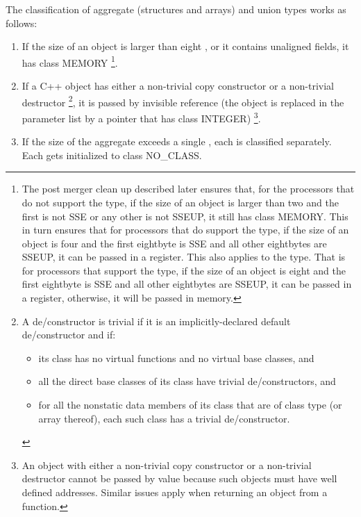 The classification of aggregate (structures and arrays) and union
types works as follows:

\begin{enumerate}
\item If the size of an object is larger than eight \eightbytes, or
  it contains unaligned fields, it has class MEMORY
  \footnote{The post merger clean up described later ensures that,
  for the processors that do not support the  type, if
  the size of an object is larger than two \eightbytes and the first
  \eightbyte is not SSE or any other \eightbyte is not SSEUP, it still
  has class MEMORY. This in turn ensures that for processors that
  do support the  type, if the size of an object is
  four \eightbytes and the first eightbyte is SSE and all other
  eightbytes are SSEUP, it can be passed in a register. This also
  applies to the  type.  That is for processors that support
  the  type, if the size of an object is eight \eightbytes
  and the first eightbyte is SSE and all other eightbytes are SSEUP, it
  can be passed in a register, otherwise, it will be passed in memory.}.

\item If a C++ object has either a non-trivial copy constructor
    or a non-trivial destructor
  \footnote{A de/constructor is trivial if it is an implicitly-declared
             default de/constructor and if:
    \begin{itemize}
        \item its class has no virtual functions
          and no virtual base classes, and

        \item all the direct base classes of its class have trivial
          de/constructors, and

        \item for all the nonstatic data members of its class that are
          of class type (or array thereof), each such class has a
          trivial de/constructor.
    \end{itemize}},
    it is passed by invisible reference
    (the object is replaced in the parameter list by a pointer that
    has class INTEGER)
  \footnote{An object with either a non-trivial copy
   constructor or a non-trivial destructor cannot be passed by value
   because such objects must have well defined addresses.  Similar
   issues apply when returning an object from a function.}.

\item If the size of the aggregate exceeds a single \eightbyte, each is
    classified separately.  Each \eightbyte gets initialized to class NO_CLASS.


\end{enumerate}

